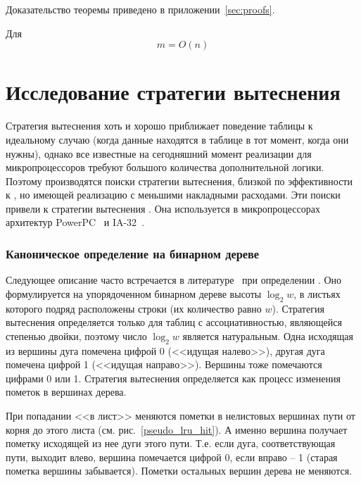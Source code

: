 \begin{theorem}\label{thm_mirror_lenth_lru} \UpperBoundLRUMirror
\end{theorem}
Доказательство теоремы приведено в приложении~\ref{sec:proofs}.
\begin{sld} Для \LRU
      $$m = O(n)$$
\end{sld}



\section{Исследование стратегии вытеснения \PseudoLRU}\label{sec:plru_new_definition}

Стратегия вытеснения \LRU хоть и хорошо приближает поведение
таблицы к идеальному случаю (когда данные находятся в
таблице в тот момент, когда они нужны), однако все известные на
сегодняшний момент реализации \LRU для микропроцессоров требуют большого
количества дополнительной логики. Поэтому производятся поиски
стратегии вытеснения, близкой по эффективности к \LRU, но имеющей
реализацию с меньшими накладными расходами. Эти поиски привели к
стратегии вытеснения \PseudoLRU. Она используется в микропроцессорах архитектур
PowerPC~\cite{PowerPC} и IA-32~\cite{FundamentalOfComputerOrganizationAndDesign}.

\subsubsection{Каноническое определение \PseudoLRU на бинарном дереве}

Следующее описание часто встречается в
литературе~\cite{FundamentalOfComputerOrganizationAndDesign} при
определении \PseudoLRU. Оно формулируется на
упорядоченном бинарном дереве высоты $\log_2 w$, в листьях которого
подряд расположены строки (их количество равно $w$). Стратегия вытеснения
\PseudoLRU
определяется только для таблиц с ассоциативностью, являющейся степенью двойки,
поэтому число $\log_2 w$ является натуральным. Одна исходящая из вершины дуга
помечена цифрой 0 (<<идущая налево>>), другая дуга помечена цифрой 1 (<<идущая
направо>>). Вершины тоже помечаются цифрами 0 или 1. Стратегия вытеснения
определяется как процесс изменения пометок в вершинах дерева.

При попадании <<в лист>> меняются пометки в нелистовых вершинах пути от корня до
этого листа (см. рис.~\ref{pseudo_lru_hit}). А именно вершина получает пометку
исходящей из нее дуги этого пути. Т.е. если дуга, соответствующая пути, выходит
влево, вершина помечается цифрой 0, если вправо -- 1 (старая пометка вершины
забывается). Пометки остальных вершин дерева не меняются.

